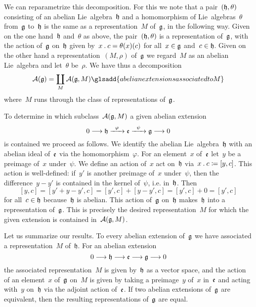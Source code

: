\begin{fluff}
	We can reparametrize this decomposition.
	For this we note that a pair~$(\mathfrak{h}, \theta)$ consisting of an abelian Lie~algebra~$\mathfrak{h}$ and a homomorphism of Lie~algebras~$\theta$ from~$\mathfrak{g}$ to~$\mathfrak{h}$ is the same as a representation~$M$ of~$\mathfrak{g}$, in the following way.
	Given on the one hand~$\mathfrak{h}$ and~$\theta$ as above, the pair~$(\mathfrak{h}, \theta)$ is a representation of~$\mathfrak{g}$, with the action of~$\mathfrak{g}$ on~$\mathfrak{h}$ given by~$x \mathbin{.} c = \theta(x)(c)$ for all~$x \in \mathfrak{g}$ and~$c \in \mathfrak{h}$.
	Given on the other hand a representation~$(M, \rho)$ of~$\mathfrak{g}$ we regard~$M$ as an abelian Lie~algebra and let~$\theta$ be~$\rho$.
	We have thus a decomposition
	\[
		\AbEx(\glie)
		=
		\coprod_M \AbEx(\glie, M)
		\glsadd{abelian extensions associated to M}
	\]
	where~$M$ runs through the class of representations of~$\mathfrak{g}$.

	To determine in which subclass~$\mathcal{A}(\mathfrak{g}, M)$ a given abelian extension
	\[
		0
		\to
		\hlie
		\xto{\varphi}
		\elie
		\xto{\psi}
		\glie
		\to
		0
	\]
	is contained we proceed as follows.
	We identify the abelian Lie~algebra~$\mathfrak{h}$ with an abelian ideal of~$\mathfrak{e}$ via the homomorphism~$\varphi$.
	For an element~$x$ of~$\mathfrak{e}$ let~$y$ be a preimage of~$x$ under~$\psi$.
	We define an action of~$x$ act on~$\mathfrak{h}$ via~$x \mathbin{.} c \coloneqq [y, c]$.
	This action is well-defined:
	if~$y'$ is another preimage of~$x$ under~$\psi$, then the difference~$y - y'$ is contained in the kernel of~$\psi$, i.e. in~$\mathfrak{h}$.
	Then
	\[
		[y, c]
		=
		[y' + y - y', c]
		=
		[y', c] + [y - y', c]
		=
		[y', c] + 0
		=
		[y', c]
	\]
	for all~$c \in \mathfrak{h}$ because~$\mathfrak{h}$ is abelian.
	This action of~$\mathfrak{g}$ on~$\mathfrak{h}$ makes~$\mathfrak{h}$ into a representation of~$\mathfrak{g}$.
	This is precisely the desired representation~$M$ for which the given extension is contained in~$\mathcal{A}(\mathfrak{g}, M)$.

	Let us summarize our results.
	To every abelian extension of~$\mathfrak{g}$ we have associated a representation~$M$ of~$\mathfrak{h}$.
	For an abelian extension
	\[
		0
		\to
		\hlie
		\to
		\elie
		\to
		\glie
		\to
		0
	\]
	the associated representation~$M$ is given by~$\mathfrak{h}$ as a vector space, and the action of an element~$x$ of~$\mathfrak{g}$ on~$M$ is given by taking a preimage~$y$ of~$x$ in~$\mathfrak{e}$ and acting with~$y$ on~$\mathfrak{h}$ via the adjoint action of~$\mathfrak{e}$.
	If two abelian extensions of~$\mathfrak{g}$ are equivalent, then the resulting representations of~$\mathfrak{g}$ are equal.
\end{fluff}


